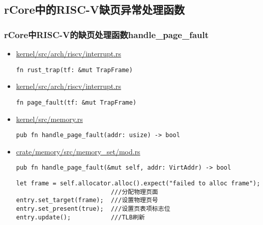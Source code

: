 \subsection{rCore中的RISC-V缺页异常处理函数}
\begin{frame}   
	\frametitle{rCore中RISC-V的缺页处理函数handle\_page\_fault}
    \begin{itemize}
        \item \href{https://github.com/rcore-os/rCore/blob/master/kernel/src/arch/riscv/interrupt.rs#L56}{kernel/src/arch/riscv/interrupt.rs}
\begin{verbatim}
fn rust_trap(tf: &mut TrapFrame)
\end{verbatim} \pause
        \item \href{https://github.com/rcore-os/rCore/blob/master/kernel/src/arch/riscv/interrupt.rs#L125}{kernel/src/arch/riscv/interrupt.rs}
\begin{verbatim}
fn page_fault(tf: &mut TrapFrame)
\end{verbatim} \pause
        \item \href{https://github.com/rcore-os/rCore/blob/master/kernel/src/memory.rs#L132}{kernel/src/memory.rs}
\begin{verbatim}
pub fn handle_page_fault(addr: usize) -> bool
\end{verbatim} \pause
        \item \href{https://github.com/rcore-os/rCore/blob/master/crate/memory/src/memory_set/mod.rs#L379}{crate/memory/src/memory_set/mod.rs}
\begin{verbatim}
pub fn handle_page_fault(&mut self, addr: VirtAddr) -> bool
\end{verbatim}
\pause
\begin{block}{}
\begin{verbatim}
let frame = self.allocator.alloc().expect("failed to alloc frame");
                          ///分配物理页面
entry.set_target(frame);  ///设置物理页号
entry.set_present(true);  ///设置页表项标志位
entry.update();           ///TLB刷新
\end{verbatim}
\end{block}
    \end{itemize}
\end{frame}
% 
% 
% 
% 
% 
% 


